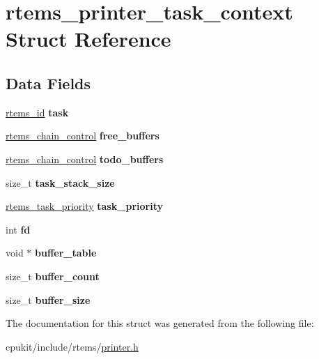 \hypertarget{structrtems__printer__task__context}{}\section{rtems\+\_\+printer\+\_\+task\+\_\+context Struct Reference}
\label{structrtems__printer__task__context}
\subsection*{Data Fields}
\begin{DoxyCompactItemize}
\item 
\mbox{\label{structrtems__printer__task__context_aa786269c0234ae2f8ef207c1db50643f}} 
\mbox{\hyperlink{group__ClassicTasks_gab20892b814dced7dd4e5b9bf42becd57}{rtems\+\_\+id}} {\bfseries task}
\item 
\mbox{\label{structrtems__printer__task__context_ae9b2ee0e467937e0a6e693a3fa535b27}} 
\mbox{\hyperlink{unionChain__Control}{rtems\+\_\+chain\+\_\+control}} {\bfseries free\+\_\+buffers}
\item 
\mbox{\label{structrtems__printer__task__context_a68c30b9054896d0b605a2c306b2813c9}} 
\mbox{\hyperlink{unionChain__Control}{rtems\+\_\+chain\+\_\+control}} {\bfseries todo\+\_\+buffers}
\item 
\mbox{\label{structrtems__printer__task__context_a58e18d827b10270bb3df32445352e7d9}} 
size\+\_\+t {\bfseries task\+\_\+stack\+\_\+size}
\item 
\mbox{\label{structrtems__printer__task__context_a8d006ea41785b7121d43082ce40069f6}} 
\mbox{\hyperlink{group__ClassicTasks_gaa80a0c0938307d1e99d0eb5fee765b47}{rtems\+\_\+task\+\_\+priority}} {\bfseries task\+\_\+priority}
\item 
\mbox{\label{structrtems__printer__task__context_afc6d87891727d47fa585c60a126a10f0}} 
int {\bfseries fd}
\item 
\mbox{\label{structrtems__printer__task__context_ade896dd2717b47e65785281f931e5a2e}} 
void $\ast$ {\bfseries buffer\+\_\+table}
\item 
\mbox{\label{structrtems__printer__task__context_a7180d6e243afed73f61487ec6bcd700a}} 
size\+\_\+t {\bfseries buffer\+\_\+count}
\item 
\mbox{\label{structrtems__printer__task__context_a08a53d39868415b823d7420ee67b27a9}} 
size\+\_\+t {\bfseries buffer\+\_\+size}
\end{DoxyCompactItemize}


The documentation for this struct was generated from the following file\+:\begin{DoxyCompactItemize}
\item 
cpukit/include/rtems/\mbox{\hyperlink{printer_8h}{printer.\+h}}\end{DoxyCompactItemize}
